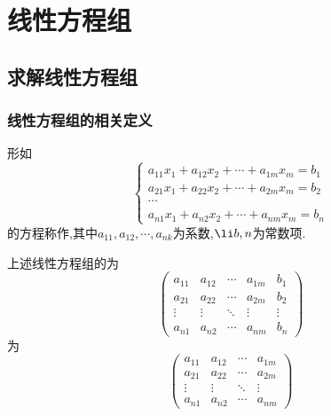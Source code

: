 \documentclass{ctexart}
\begin{document}
\section{线性方程组}
\subsection{求解线性方程组}
\subsubsection{线性方程组的相关定义}
\begin{definition}[线性方程组]
    形如
    \[\left\{\begin{array}{c}
        a_{11}x_1+a_{12}x_2+\cdots+a_{1m}x_m=b_1\\
        a_{21}x_1+a_{22}x_2+\cdots+a_{2m}x_m=b_2\\
        \cdots\\
        a_{n1}x_1+a_{n2}x_2+\cdots+a_{nm}x_m=b_n
    \end{array}\right.\]
    的方程称作,其中$a_{11},a_{12},\cdots,a_{nk}$为系数,$\li b,n$为常数项.
\end{definition}
\begin{definition}[增广矩阵和系数矩阵]
    上述线性方程组的为
    \[\begin{pmatrix}
        a_{11}  &   a_{12}  &   \cdots  &   a_{1m}  & b_1\\
        a_{21}  &   a_{22}  &   \cdots  &   a_{2m}  & b_2\\
        \vdots&\vdots&\ddots&\vdots&\vdots\\
        a_{n1}  &   a_{n2}  &   \cdots  &   a_{nm}  & b_n
    \end{pmatrix}\]
    为
    \[\begin{pmatrix}
        a_{11}  &   a_{12}  &   \cdots  &   a_{1m}\\
        a_{21}  &   a_{22}  &   \cdots  &   a_{2m}\\
        \vdots&\vdots&\ddots&\vdots\\
        a_{n1}  &   a_{n2}  &   \cdots  &   a_{nm}
    \end{pmatrix}\]
\end{definition}
\end{document}
